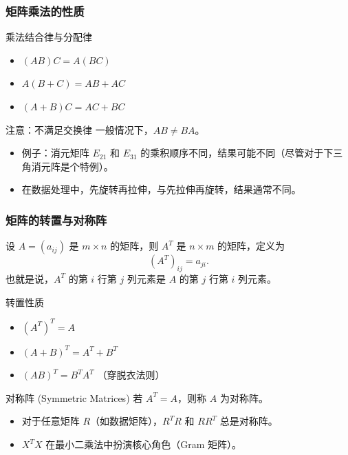 
\begin{frame}
\frametitle{矩阵乘法的性质}

\begin{block}{乘法结合律与分配律}
\begin{itemize}
    \item $(AB)C = A(BC)$
    \item $A(B+C) = AB + AC$
    \item $(A+B)C = AC + BC$
\end{itemize}
\end{block}

\begin{alertblock}{注意：不满足交换律}
一般情况下，$AB \neq BA$。
\begin{itemize}
    \item 例子：消元矩阵 $E_{21}$ 和 $E_{31}$ 的乘积顺序不同，结果可能不同（尽管对于下三角消元阵是个特例）。
    \item 在数据处理中，先旋转再拉伸，与先拉伸再旋转，结果通常不同。
\end{itemize}
\end{alertblock}

\end{frame}


\begin{frame}
\frametitle{矩阵的转置与对称阵}

\begin{Def}[转置 (Transpose)]
设 $A = (a_{ij})$ 是 $m \times n$ 的矩阵，则 $A^T$ 是 $n \times m$ 的矩阵，定义为
\[(A^T)_{ij} = a_{ji}.\]
也就是说，$A^T$ 的第 $i$ 行第 $j$ 列元素是 $A$ 的第 $j$ 行第 $i$ 列元素。
\end{Def}

\begin{block}{转置性质}
\begin{itemize}
    \item $(A^T)^T = A$
    \item $(A+B)^T = A^T + B^T$
    \item \textbf{$(AB)^T = B^T A^T$} （穿脱衣法则）
\end{itemize}
\end{block}

\pause

\begin{block}{对称阵 (Symmetric Matrices)}
若 $A^T = A$，则称 $A$ 为对称阵。
\begin{itemize}
    \item 对于任意矩阵 $R$（如数据矩阵），$R^T R$ 和 $R R^T$ 总是对称阵。
    \item $X^T X$ 在最小二乘法中扮演核心角色（Gram 矩阵）。
\end{itemize}
\end{block}
\end{frame}

